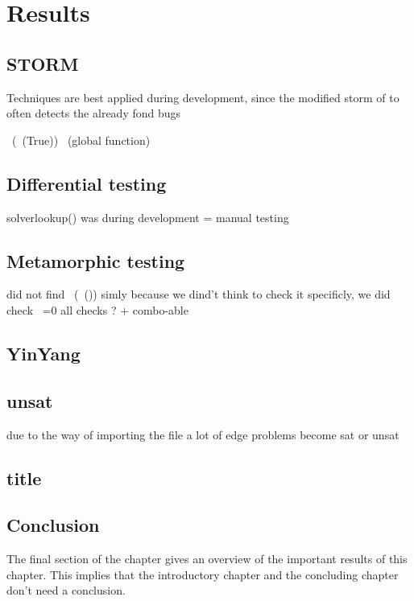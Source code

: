 \chapter{Results}
\label{cha:6}


\section{STORM}
Techniques are best applied during development, since the modified storm of to often detects the already fond bugs


~(~(True))
~(global function)
\section{Differential testing}
solverlookup()  was during development = manual testing

\section{Metamorphic testing}
did not find ~(~()) simly because we dind't think to check it specificly, we did check ~=0
all checks ? + combo-able

\section{YinYang}


\section{unsat}
due to the way of importing the file a lot of edge problems become sat or unsat

\section{title}


\section{Conclusion}
The final section of the chapter gives an overview of the important results
of this chapter. This implies that the introductory chapter and the
concluding chapter don't need a conclusion.

